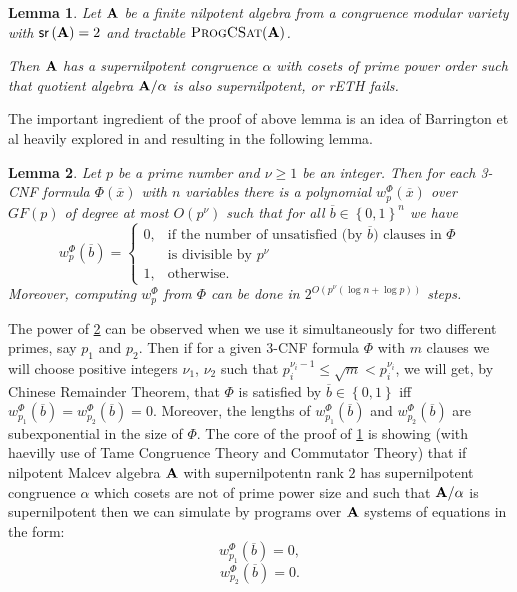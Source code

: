 \documentclass[11pt,a4paper]{amsart}
\newtheorem{lm}{Lemma}[section]
\newcommand{\m}[1]{{\uppercase {\bf{#1}}}}
\newcommand{\set}[1]{{\left\{ {#1} \right\} }}
\renewcommand{\leq}{\leqslant}
\renewcommand{\geq}{\geqslant}
\renewcommand{\o}[1]{\overline {#1}}
\newcommand{\gProblem}[2]{\ensuremath{\operatorname{\textup{\textsc{{#2}}}}
		\ifthenelse{\equal{#1}{}}{}{\!\left( {#1} \right)}}}
\newcommand{\progcsat}[1]{\gProblem{#1}{ProgCSat}}
\newcommand{\cm}{congruence modular }
\newcommand{\sr}[1]{{\mathsf{sr}\left(#1\right)}}
\newcommand{\rethh}{rETH\xspace}
\begin{document}
\begin{lm}
\label{lm:hard}
Let $\m A$ be a finite nilpotent algebra from a \cm variety with $\sr{\m A}=2$ and tractable $\progcsat{\m A}$.

Then $\m A$ has a supernilpotent congruence $\alpha$ with cosets of prime power order such that quotient algebra $\m A/\alpha$ is also supernilpotent, or \rethh fails.
\end{lm}

The important ingredient of the proof of above lemma is an idea of Barrington et al \cite{BarringtonBR94} heavily explored in \cite{idziakKK22LICS} and \cite{IdziakKKW22-icalp} resulting in the following lemma.

\begin{lm}
\label{lm:pseudo-and}
Let $p$ be a prime number and $\nu \geq 1$ be an integer.
Then for each 3-CNF formula $\Phi(\o x)$ with $n$ variables
there is a polynomial $w^\Phi_{p}(\o x)$ over  $GF(p)$
of degree at most $O(p^\nu)$
such that for all $\o b \in \set{0,1}^n$ we have
\[
w^\Phi_{p}(\o b) =
\left\{
\begin{array}{ll}
0, &\mbox{if the number of unsatisfied (by $\o b$) clauses in $\Phi$}\\
    &\mbox{is divisible by $p^\nu$}\\
1, &\mbox{otherwise.}
\end{array}
\right.
\]
Moreover, computing $w^\Phi_{p}$ from $\Phi$ can be done in $2^{O(p^\nu(\log n+\log p))}$ steps.
\end{lm}

The power of \cref{lm:pseudo-and} can be observed when we use it simultaneously for two different primes, say $p_1$ and $p_2$. Then if for a given 3-CNF formula $\Phi$ with $m$ clauses we will choose  positive integers $\nu_1$, $\nu_2$ such that $p_i^{\nu_i-1}\leq \sqrt{m}< p_i^{\nu_i}$, we will get, by Chinese Remainder Theorem, that $\Phi$ is satisfied by $\o b\in\set{0,1}$ iff $w^\Phi_{p_1}(\o b) =w^\Phi_{p_2}(\o b) = 0$. Moreover, the lengths of $w^\Phi_{p_1}(\o b)$ and $w^\Phi_{p_2}(\o b)$ are subexponential in the size of $\Phi$. The core of the proof of \cref{lm:hard} is showing (with haevilly use of Tame Congruence Theory and Commutator Theory) that if nilpotent Malcev algebra $\m A$ with supernilpotentn rank $2$ has supernilpotent congruence $\alpha$ which cosets are not of prime power size and such that $\m A/\alpha$ is supernilpotent then we can simulate by programs over $\m A$ systems of equations in the form:
\[
w^\Phi_{p_1}(\o b) = 0,
\]
\[
w^\Phi_{p_2}(\o b) = 0.
\]
\end{document}
